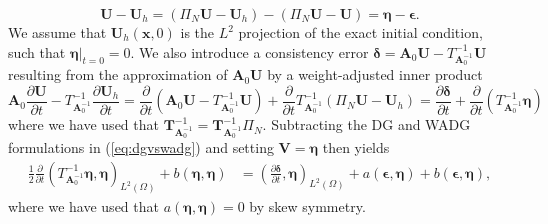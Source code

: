 \documentclass{siamart0216}
\newcommand{\pd}[2]{\frac{\partial#1}{\partial#2}}
\newcommand{\LRp}[1]{\left( #1 \right)}
\renewcommand{\L}{L^2\LRp{\Omega}}
\begin{document}
\[
\bm{U}-\bm{U}_h  = \LRp{\Pi_N\bm{U}-\bm{U}_h}-\LRp{\Pi_N\bm{U}-\bm{U}} = \bm{\eta} - \bm{\epsilon}.
\]
We assume that $\bm{U}_h(\bm{x},0)$ is the $L^2$ projection of the exact initial condition, such that $\left.\bm{\eta}\right|_{t=0} = 0$.  We also introduce a consistency error $\bm{\delta} = \bm{A}_0\bm{U} - T_{\bm{A}_0^{-1}}^{-1}\bm{U}$ resulting from the approximation of $\bm{A}_0\bm{U}$ by a weight-adjusted inner product
\[
\bm{A}_0\pd{\bm{U}}{t} - T_{\bm{A}_0^{-1}}^{-1}\pd{\bm{U}_h}{t} = \pd{}{t}\LRp{\bm{A}_0\bm{U} - T_{\bm{A}_0^{-1}}^{-1}\bm{U}} + \pd{}{t}T_{\bm{A}_0^{-1}}^{-1}\LRp{\Pi_N\bm{U}-\bm{U}_h} = \pd{\bm{\delta}}{t} + \pd{}{t}\LRp{T_{\bm{A}_0^{-1}}^{-1}\bm{\eta}}
\]  
where we have used that $\bm{T}_{\bm{A}_0^{-1}}^{-1} = \bm{T}_{\bm{A}_0^{-1}}^{-1}\Pi_N$.  Subtracting the DG and WADG formulations in (\ref{eq:dgvswadg}) and setting $\bm{V} = \bm{\eta}$ then yields 
\begin{align}
\frac{1}{2}\pd{}{t}\LRp{T^{-1}_{\bm{A}_0^{-1}}\bm{\eta},\bm{\eta}}_{\L} + b(\bm{\eta},\bm{\eta}) &= \LRp{\pd{\bm{\delta}}{t},\bm{\eta}}_{\L} + a(\bm{\epsilon},\bm{\eta}) + b(\bm{\epsilon},\bm{\eta}),
\label{eq:erreqn}
\end{align}
where we have used that $a(\bm{\eta},\bm{\eta}) = 0$ by skew symmetry.  
\end{document}
